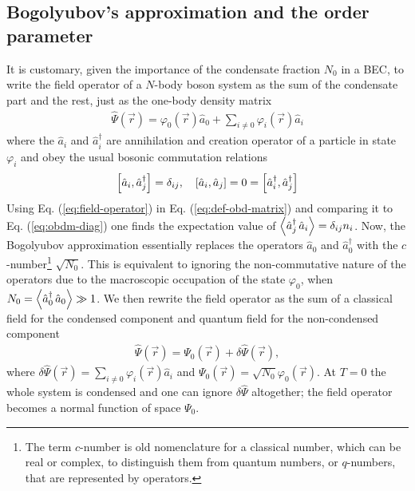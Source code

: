 		\subsection{Bogolyubov's approximation and the order parameter}\label{sec:bogol-order}
			It is customary, given the importance of the condensate fraction $N_0$ in a BEC, to write the field operator of a $N$-body boson system as the sum of the condensate part and the rest, just as the one-body density matrix
			\begin{align}
				\hat{\Psi}(\vec{r})=\varphi_0(\vec{r})\hat{a}_0 + \sum_{i\neq 0} \varphi_i(\vec{r})\hat{a}_i \label{eq:field-operator}
			\end{align}
			where the $\hat{a}_i$ and $\hat{a}_i^\dagger$ are annihilation and creation operator of a particle in state $\varphi_i$ and obey the usual bosonic commutation relations
			\begin{align}
				\commutator{\hat{a}_i}{\hat{a}_j^\dagger}=\delta_{ij},\quad 	\commutator{\hat{a}_i}{\hat{a}_j}=0=\commutator{\hat{a}_i^\dagger}{\hat{a}_j^\dagger}
			\end{align}
			Using Eq. (\ref{eq:field-operator}) in Eq. (\ref{eq:def-obd-matrix}) and comparing it to Eq. (\ref{eq:obdm-diag}) one finds the expectation value of $\expectationvalue{\hat{a}_j^\dagger\,\hat{a}_i}=\delta_{ij}n_i$. Now, the Bogolyubov approximation essentially replaces the operators $\hat{a}_0$ and $\hat{a}_0^\dagger$ with the $c$-number\footnote{The term $c$-number is old nomenclature for a classical number, which can be real or complex, to distinguish them from quantum numbers, or $q$-numbers, that are represented by operators.} $\sqrt{N_0}$. This is equivalent to ignoring the non-commutative nature of the operators due to the macroscopic occupation of the state $\varphi_0$, when $N_0=\expectationvalue{\hat{a}_0^\dagger\,\hat{a}_0}\gg 1$. We then rewrite the field operator as the sum of a classical field for the condensed component and quantum field for the non-condensed component
			\begin{align}
				\hat{\Psi}(\vec{r})=\Psi_0(\vec{r})+\delta\hat{\Psi}(\vec{r}),\label{eq:order-param-real}
			\end{align}
			where $\delta\hat{\Psi}(\vec{r})=\sum_{i\neq 0}\varphi_i(\vec{r})\hat{a}_i$ and $\Psi_0(\vec{r})=\sqrt{N_0}\varphi_0(\vec{r})$. At $T=0$ the whole system is condensed and one can ignore $\delta\hat{\Psi}$ altogether; the field operator becomes a normal function of space $\Psi_0$.\\
			

